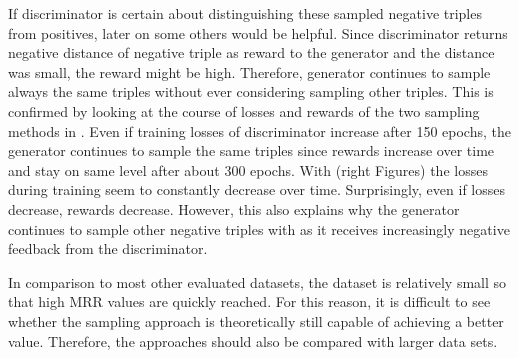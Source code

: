 If discriminator is certain about distinguishing these sampled negative triples from positives, later on some others would be helpful.
Since discriminator returns negative distance of negative triple as reward to the generator and the distance was small, the reward might be high.
Therefore, generator continues to sample always the same triples without ever considering sampling other triples.
This is confirmed by looking at the course of losses and rewards of the two sampling methods in .
Even if training losses of discriminator increase after 150 epochs, the generator continues to sample the same triples since rewards increase over time and stay on same level after about 300 epochs.
With \ussoftmax (right Figures) the losses during training seem to constantly decrease over time.
Surprisingly, even if losses decrease, rewards decrease.
However, this also explains why the generator continues to sample other negative triples with \ussoftmax as it receives increasingly negative feedback from the discriminator.

In comparison to most other evaluated datasets, the \umls dataset is relatively small so that high MRR values are quickly reached.
For this reason, it is difficult to see whether the sampling approach is theoretically still capable of achieving a better value.
Therefore, the approaches should also be compared with larger data sets.


